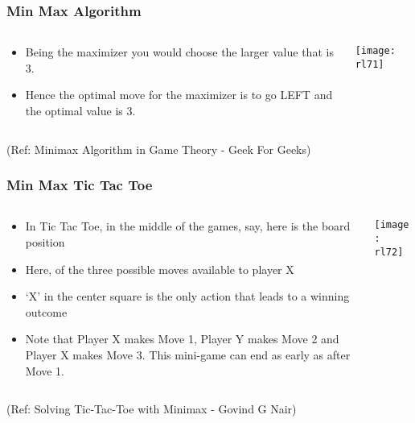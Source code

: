 \begin{frame}[fragile]\frametitle{Min Max Algorithm}


\begin{columns}
\begin{column}{0.5\textwidth}
\begin{itemize}
\item Being the maximizer you would choose the larger value that is 3. 
\item Hence the optimal move for the maximizer is to go LEFT and the optimal value is 3.
\end{itemize}

\end{column}
\begin{column}{0.5\textwidth}  %
\begin{center}
\texttt{[image: rl71]}
\end{center}
\end{column}
\end{columns}

{\tiny (Ref: Minimax Algorithm in Game Theory - Geek For Geeks)}

\end{frame}

\begin{frame}[fragile]\frametitle{Min Max Tic Tac Toe}


\begin{columns}
\begin{column}{0.5\textwidth}
\begin{itemize}
\item In Tic Tac Toe, in the middle of the games, say, here is the board position
\item Here, of the three possible moves available to player X
\item  ‘X' in the center square is the only action that leads to a winning outcome
\item Note that Player X makes Move 1, Player Y makes Move 2 and Player X makes Move 3. This mini-game can end as early as after Move 1.
\end{itemize}

\end{column}
\begin{column}{0.5\textwidth}  %
\begin{center}
\texttt{[image: rl72]}
\end{center}
\end{column}
\end{columns}

{\tiny (Ref: Solving Tic-Tac-Toe with Minimax - Govind G Nair)}

\end{frame}


